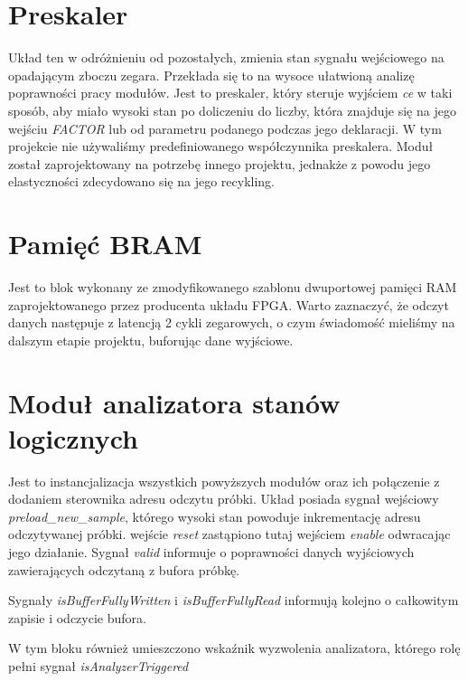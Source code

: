 \section{Preskaler}
	Układ ten w odróżnieniu od pozostałych, zmienia stan sygnału wejściowego na opadającym zboczu zegara.
Przekłada się to na wysoce ułatwioną analizę poprawności pracy modułów. Jest to preskaler, który steruje wyjściem
\emph{ce} w taki sposób, aby miało wysoki stan po doliczeniu do liczby, która znajduje się na jego wejściu \emph{FACTOR} lub od parametru podanego podczas jego deklaracji. W tym projekcie nie używaliśmy predefiniowanego współczynnika preskalera. Moduł został zaprojektowany na potrzebę innego projektu, jednakże z powodu jego elastyczności zdecydowano się na jego recykling.

\section{Pamięć BRAM}
	Jest to blok wykonany ze zmodyfikowanego szablonu dwuportowej pamięci RAM zaprojektowanego przez producenta układu FPGA. Warto zaznaczyć, że odczyt danych następuje z latencją 2 cykli zegarowych, o czym świadomość mieliśmy na dalszym etapie projektu, buforując dane wyjściowe.
	
\section{Moduł analizatora stanów logicznych}

Jest to instancjalizacja wszystkich powyższych modułów oraz ich połączenie z dodaniem sterownika adresu odczytu próbki. Układ posiada sygnał wejściowy \emph{preload\_new\_sample}, którego wysoki stan powoduje inkrementację adresu odczytywanej próbki. wejście \emph{reset} zastąpiono tutaj wejściem \emph{enable} odwracając jego działanie. Sygnał \emph{valid} informuje o poprawności danych wyjściowych zawierających odczytaną z bufora próbkę.

Sygnały \emph{isBufferFullyWritten} i \emph{isBufferFullyRead} informują kolejno o całkowitym zapisie i odczycie bufora.

W tym bloku również umieszczono wskaźnik wyzwolenia analizatora, którego rolę pełni sygnał \emph{isAnalyzerTriggered}

